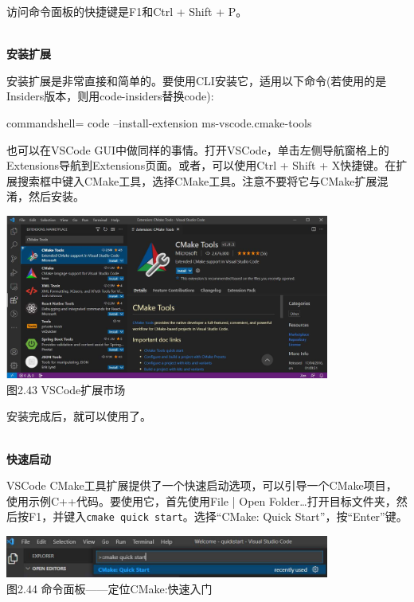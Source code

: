 访问命令面板的快捷键是F1和Ctrl + Shift + P。

\hspace*{\fill} \\ %
\noindent
\textbf{安装扩展}

安装扩展是非常直接和简单的。要使用CLI安装它，适用以下命令(若使用的是Insiders版本，则用code-insiders替换code):

\begin{tcblisting}{commandshell={}}
code --install-extension ms-vscode.cmake-tools
\end{tcblisting}

也可以在VSCode GUI中做同样的事情。打开VSCode，单击左侧导航窗格上的Extensions导航到Extensions页面。或者，可以使用Ctrl + Shift + X快捷键。在扩展搜索框中键入CMake工具，选择CMake工具。注意不要将它与CMake扩展混淆，然后安装。

\begin{center}
\includegraphics[width=0.8\textwidth]{content/1/chapter2/images/43.jpg}\\
图2.43  VSCode扩展市场
\end{center}

安装完成后，就可以使用了。

\hspace*{\fill} \\ %
\noindent
\textbf{快速启动}

VSCode CMake工具扩展提供了一个快速启动选项，可以引导一个CMake项目，使用示例C++代码。要使用它，首先使用File | Open Folder…打开目标文件夹，然后按F1，并键入\texttt{cmake quick start}。选择“CMake: Quick Start”，按“Enter”键。

\begin{center}
\includegraphics[width=0.8\textwidth]{content/1/chapter2/images/44.jpg}\\
图2.44 命令面板——定位CMake:快速入门
\end{center}

